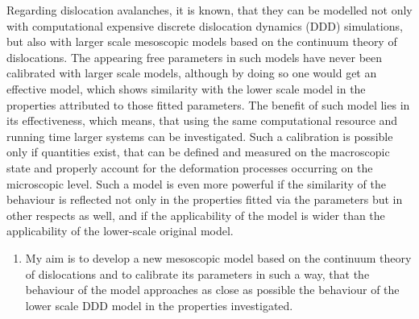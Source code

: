 \documentclass[a5paper,twoside,10pt]{article}
\begin{document}
Regarding dislocation avalanches, it is known, that they can be modelled not only with computational expensive discrete dislocation dynamics (DDD) simulations\cite{PhysRevLett.112.235501}, but also with larger scale mesoscopic models based on the continuum theory of dislocations\cite{1742-5468-2005-08-P08004}. The appearing free parameters in such models have never been calibrated with larger scale models, although by doing so one would get an effective model, which shows similarity with the lower scale model in the properties attributed to those fitted parameters. The benefit of such model lies in its effectiveness, which means, that using the same computational resource and running time larger systems can be investigated. Such a calibration is possible only if quantities exist, that can be defined and measured on the macroscopic state and properly account for the deformation processes occurring on the microscopic level. Such a model is even more powerful if the similarity of the behaviour is reflected not only in the properties fitted via the parameters but in other respects as well, and if the applicability of the model is wider than the applicability of the lower-scale original model.

\begin{enumerate}
\setcounter{enumi}{0}
\item My aim is to develop a new mesoscopic model based on the continuum theory of dislocations and to calibrate its parameters in such a way, that the behaviour of the model approaches as close as possible the behaviour of the lower scale DDD model in the properties investigated.
\end{enumerate}
\end{document}
